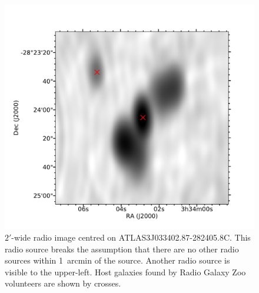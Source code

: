 \documentclass[fleqn,usenatbib,usedcolumn]{mnras}
\begin{document}
     \begin{figure}
      \centering
      \includegraphics[width=\linewidth]{images/CI0077C1_fig.pdf}
      \caption{$2'$-wide radio image centred on ATLAS3\textunderscore{}J033402.87-282405.8C.
        This radio source breaks the assumption that there are no other radio
        sources within 1~arcmin of the source. Another radio source is visible
        to the upper-left. Host galaxies found by Radio Galaxy Zoo volunteers
        are shown by crosses.}
      \label{fig:broken-isolation}
    \end{figure}
\end{document}
